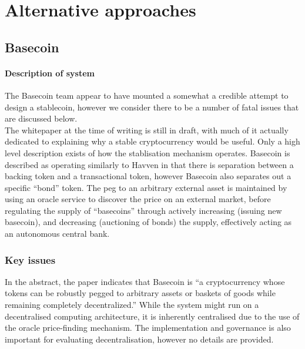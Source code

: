 \section{Alternative approaches}

\subsection{Basecoin}

\paragraph{Description of system}

The Basecoin team appear to have mounted a somewhat a credible attempt to design a stablecoin, however we consider there to be a number of fatal issues that are discussed below. \\

\noindent The whitepaper at the time of writing is still in draft, with much of it actually dedicated to explaining why a stable cryptocurrency would be useful. Only a high level description exists of how the stablisation mechanism operates. Basecoin is described as operating similarly to Havven in that there is separation between a backing token and a transactional token, however Basecoin also separates out a specific ``bond'' token. The peg to an arbitrary external asset is maintained by using an oracle service to discover the price on an external market, before regulating the supply of ``basecoins'' through actively increasing (issuing new basecoin), and decreasing (auctioning of bonds) the supply, effectively acting as an autonomous central bank. \\

\subsubsection{Key issues}

\noindent In the abstract, the paper indicates that Basecoin is ``a cryptocurrency whose tokens can be robustly pegged to arbitrary assets or baskets of goods while remaining completely decentralized.'' While the system might run on a decentralised computing architecture, it is inherently centralised due to the use of the oracle price-finding mechanism. The implementation and governance is also important for evaluating decentralisation, however no details are provided. \\

